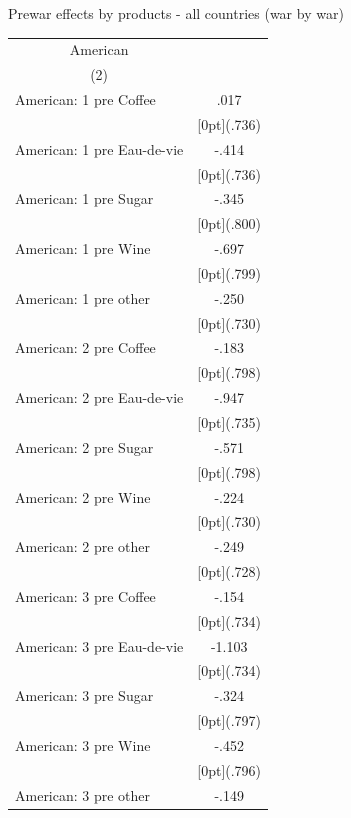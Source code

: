 \documentclass[12pt,a4paper,titlepage]{article}
\begin{document}
{\newpage
\caption{Prewar effects by products - all countries (war by war)}
\begin{tabular*}{\textwidth}{@{\extracolsep{\fill}}lc}	
	\multicolumn{1}{c}{American} \\
\cline{2-2}	
	\multicolumn{1}{c}{(2)} \\
\hline	
American: 1 pre Coffee &	.017 \\
&	\raisebox{.7ex}[0pt]{\scriptsize (.736)} \\
American: 1 pre Eau-de-vie &	-.414 \\
&	\raisebox{.7ex}[0pt]{\scriptsize (.736)} \\
American: 1 pre Sugar &	-.345 \\
&	\raisebox{.7ex}[0pt]{\scriptsize (.800)} \\
American: 1 pre Wine &	-.697 \\
&	\raisebox{.7ex}[0pt]{\scriptsize (.799)} \\
American: 1 pre other &	-.250 \\
&	\raisebox{.7ex}[0pt]{\scriptsize (.730)} \\
American: 2 pre Coffee &	-.183 \\
&	\raisebox{.7ex}[0pt]{\scriptsize (.798)} \\
American: 2 pre Eau-de-vie &	-.947 \\
&	\raisebox{.7ex}[0pt]{\scriptsize (.735)} \\
American: 2 pre Sugar &	-.571 \\
&	\raisebox{.7ex}[0pt]{\scriptsize (.798)} \\
American: 2 pre Wine &	-.224 \\
&	\raisebox{.7ex}[0pt]{\scriptsize (.730)} \\
American: 2 pre other &	-.249 \\
&	\raisebox{.7ex}[0pt]{\scriptsize (.728)} \\
American: 3 pre Coffee &	-.154 \\
&	\raisebox{.7ex}[0pt]{\scriptsize (.734)} \\
American: 3 pre Eau-de-vie &	-1.103 \\
&	\raisebox{.7ex}[0pt]{\scriptsize (.734)} \\
American: 3 pre Sugar &	-.324 \\
&	\raisebox{.7ex}[0pt]{\scriptsize (.797)} \\
American: 3 pre Wine &	-.452 \\
&	\raisebox{.7ex}[0pt]{\scriptsize (.796)} \\
American: 3 pre other &	-.149 \\

\end{tabular*}}
\end{document}
